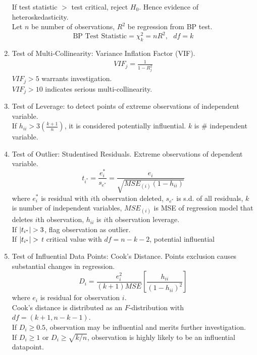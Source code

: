 \begin{enumerate}[label=\roman*.]
If test statistic $>$ test critical, reject $H_0$. Hence evidence of heteroskedasticity.\\
Let $n$ be number of observations, $R^2$ be regression from BP test.
\begin{equation}
\text{BP Test Statistic} = \chi^2_{k} = nR^2, \ \ \ df = k \nonumber
\end{equation}
\item Test of Multi-Collinearity: Variance Inflation Factor (VIF). \\
\begin{align}
VIF_j = \frac{1}{1 - R^2_j} \nonumber
\end{align}
$VIF_j > 5$ warrants investigation.\\
$VIF_j > 10$ indicates serious multi-collinearity.
\item Test of Leverage: to detect points of extreme observations of independent variable.\\
If $h_{ii} > 3 (\frac{k+1}{n})$, it is considered potentially influential. $k$ is $\#$ independent variable.
\item Test of Outlier: Studentised Residuals. Extreme observations of dependent variable.
\begin{equation}
t_{i^*} = \frac{e^{*}_i}{s_{e^*}} = \frac{e_i}{\sqrt{MSE_{(i)} (1-h_{ii})}} \nonumber
\end{equation}
where $e^{*}_i$ is residual with $i$th observation deleted, $s_{e^*}$ is s.d. of all residuals, $k$ is number of independent variables, $MSE_{(i)}$ is MSE of regression model that deletes $i$th observation, $h_{ii}$ is $i$th observation leverage.\\
If $\left\lvert t_{i^*}\right\rvert > 3$, flag observation as outlier.\\
If $\left\lvert t_{i^*}\right\rvert >$ $t$ critical value with $df=n-k-2$, potential influential
\item Test of Influential Data Points: Cook's Distance. Points exclusion causes substantial changes in regression.\\
\begin{equation}
D_i = \frac{e_i^2}{(k+1)MSE} \left[ \frac{h_{ii}}{(1-h_{ii})^2} \right] \nonumber
\end{equation}
where $e_i$ is residual for observation $i$.\\
Cook's distance is distributed as an $F$-distribution with $df = (k+1, n-k-1)$.\\
If $D_i \geq 0.5$, observation may be influential and merits further investigation.\\
If $D_i \geq 1$ or $D_i \geq \sqrt{k/n}$, observation is highly likely to be an influential datapoint.
\end{enumerate}


